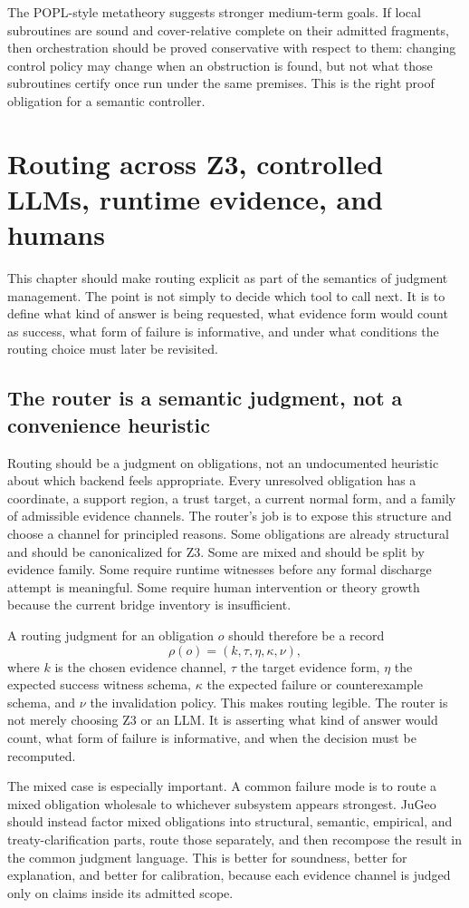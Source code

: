 \documentclass[11pt]{report}
\begin{document}
The POPL-style metatheory suggests stronger medium-term goals. If local subroutines are sound and cover-relative complete on their admitted fragments, then orchestration should be proved conservative with respect to them: changing control policy may change when an obstruction is found, but not what those subroutines certify once run under the same premises. This is the right proof obligation for a semantic controller.

\chapter{Routing across Z3, controlled LLMs, runtime evidence, and humans}
\noindent This chapter should make routing explicit as part of the semantics of judgment management. The point is not simply to decide which tool to call next. It is to define what kind of answer is being requested, what evidence form would count as success, what form of failure is informative, and under what conditions the routing choice must later be revisited.
\section{The router is a semantic judgment, not a convenience heuristic}
Routing should be a judgment on obligations, not an undocumented heuristic about which backend feels appropriate. Every unresolved obligation has a coordinate, a support region, a trust target, a current normal form, and a family of admissible evidence channels. The router's job is to expose this structure and choose a channel for principled reasons. Some obligations are already structural and should be canonicalized for Z3. Some are mixed and should be split by evidence family. Some require runtime witnesses before any formal discharge attempt is meaningful. Some require human intervention or theory growth because the current bridge inventory is insufficient.

A routing judgment for an obligation $o$ should therefore be a record
\[
\rho(o) = (k, \tau, \eta, \kappa, \nu),
\]
where $k$ is the chosen evidence channel, $\tau$ the target evidence form, $\eta$ the expected success witness schema, $\kappa$ the expected failure or counterexample schema, and $\nu$ the invalidation policy. This makes routing legible. The router is not merely choosing Z3 or an LLM. It is asserting what kind of answer would count, what form of failure is informative, and when the decision must be recomputed.

The mixed case is especially important. A common failure mode is to route a mixed obligation wholesale to whichever subsystem appears strongest. JuGeo should instead factor mixed obligations into structural, semantic, empirical, and treaty-clarification parts, route those separately, and then recompose the result in the common judgment language. This is better for soundness, better for explanation, and better for calibration, because each evidence channel is judged only on claims inside its admitted scope.
\end{document}
